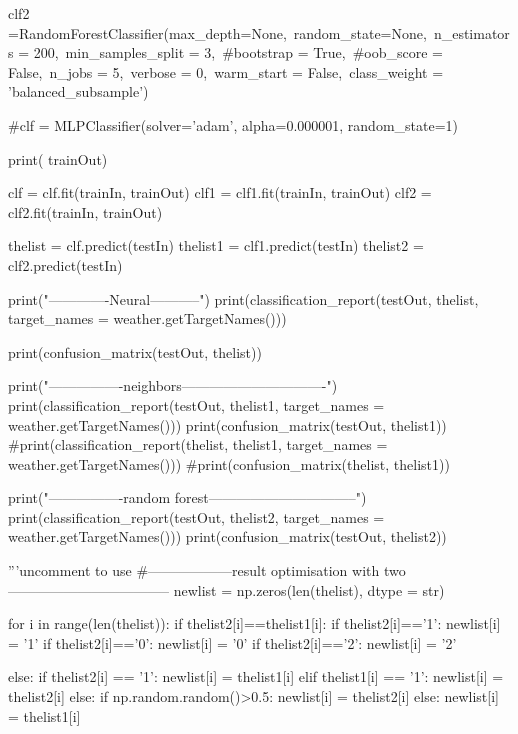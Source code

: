 \documentclass[12pt]{article}
\begin{document}
\begin{python}
clf2 =RandomForestClassifier(max_depth=None,\
                            random_state=None,\
                            n_estimators = 200,\
                            min_samples_split = 3,\
                            #bootstrap = True,\
                            #oob_score = False,\
                            n_jobs = 5,\
                            verbose = 0,\
                            warm_start = False,\
                            class_weight = 'balanced_subsample')

#clf = MLPClassifier(solver='adam', alpha=0.000001, random_state=1)



print( trainOut)

clf = clf.fit(trainIn, trainOut)
clf1 = clf1.fit(trainIn, trainOut)
clf2 = clf2.fit(trainIn, trainOut)

thelist = clf.predict(testIn)
thelist1 = clf1.predict(testIn)
thelist2 = clf2.predict(testIn)

print("-------------Neural-----------")
print(classification_report(testOut, thelist, target_names = weather.getTargetNames()))

print(confusion_matrix(testOut, thelist))

print("----------------neighbors-------------------------------")
print(classification_report(testOut, thelist1, target_names = weather.getTargetNames()))
print(confusion_matrix(testOut, thelist1))
#print(classification_report(thelist, thelist1, target_names = weather.getTargetNames()))
#print(confusion_matrix(thelist, thelist1))

print("----------------random forest--------------------------------")
print(classification_report(testOut, thelist2, target_names = weather.getTargetNames()))
print(confusion_matrix(testOut, thelist2))


'''uncomment to use
#------------------result optimisation with two-----------------------------------
newlist = np.zeros(len(thelist), dtype = str)

for i in range(len(thelist)):
    if thelist2[i]==thelist1[i]:
        if thelist2[i]=='1':
            newlist[i] = '1'
        if thelist2[i]=='0':
            newlist[i] = '0'
        if thelist2[i]=='2':
            newlist[i] = '2'

    else:
        if thelist2[i] == '1':
            newlist[i] = thelist1[i]
        elif thelist1[i] == '1':
            newlist[i] = thelist2[i]
        else:
            if np.random.random()>0.5:
                newlist[i] = thelist2[i]
            else:
                newlist[i] = thelist1[i]


\end{python}
\end{document}
